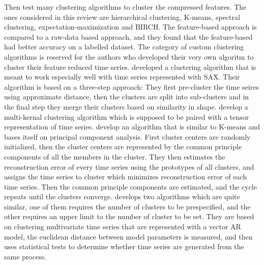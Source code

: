 Then test many clustering algorithms to cluster the compressed features. 
The ones considered in this review are hierarchical clustering, K-means, spectral clustering, expectation-maximization and BIRCH. 
The feature-based approach is compared to a raw-data based approach, and they found that the feature-based had better accuracy on a labelled dataset.
The category of custom clustering algorithms is reserved for the authors who developed their very own algoritm to cluster their feature reduced time series. 
\textcite{clust_large_datasets_aghabozorg} developed a clustering algorithm that is meant to work especially well with time series represented with SAX.
Their algorithm is based on a three-step approach: They first pre-cluster the time seires using approximate distance, 
then the clusters are split into sub-clusters and in the final step they merge their clusters based on similarity in shape. 
\textcite{tensor_multi_elastic_kernel_tsc} develop a multi-kernal clustering algorithm which is supposed to be paired with a tensor representation of time series. 
\textcite{multivariate_tsc_common_pca} develop an algorithm that is similar to K-means and bases itself on principal component analysis. 
First cluster centers are randomly initialized, then the cluster centers are represented by the common principle components of all the members in the cluster.
They then estimates the reconstruction error of every time series using the prototypes of all clusters, and assigns the time series to cluster which minimizes reconstruction error of each time series. 
Then the common principle components are estimated, and the cycle repeats until the clusters converge. %
\textcite{var_multivar_tsc} develops two algorithms which are quite similar, one of them requires the number of clusters to be prespecified, and the other requires an upper limit to the number of cluster to be set. 
They are based on clustering multivariate time series that are represented with a vector AR model, the euclidean distance between model parameters is measured, 
and then uses statistical tests to determine whether time series are generated from the same process.

